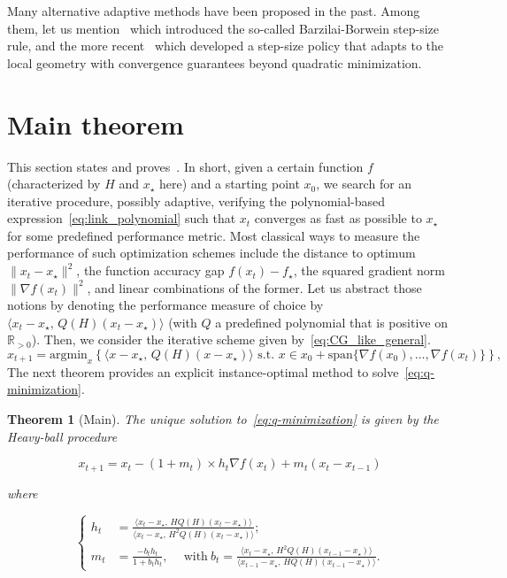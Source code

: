 \documentclass{article}
\newtheorem{Th}{Theorem}[section]
\newcommand{\Span}{\mathrm{span}}
\newcommand{\xs}{x_\star}
\begin{document}
    Many alternative adaptive methods have been proposed in the past.
    Among them, let us mention~\citep{barzilai1988two} which introduced the so-called Barzilai-Borwein step-size rule, and the more recent~\citep{malitsky2019adaptive} which developed a step-size policy that adapts to the local geometry with convergence guarantees beyond quadratic minimization.

\section{Main theorem}\label{sec:main_thm}

    This section states and proves~.
    In short, given a certain function $f$ (characterized by $H$ and $\xs$ here) and a starting point $x_0$,
    we search for an iterative procedure, possibly adaptive, verifying the polynomial-based expression~\cref{eq:link_polynomial} such that $x_t$ converges as fast as possible to $\xs$ for some predefined performance metric.
    Most classical ways to measure the performance of such optimization schemes include the distance to optimum $\|x_t - \xs\|^2$, the function accuracy gap $f(x_t) - f_\star$, the squared gradient norm $\|\nabla f(x_t)\|^2$, and linear combinations of the former.
    Let us abstract those notions by denoting the performance measure of choice by $\langle x_t - \xs,\, Q(H) (x_t - \xs)\rangle$ (with $Q$ a predefined polynomial that is positive on $\mathbb{R}_{>0}$).
    Then, we consider the iterative scheme given by~\eqref{eq:CG_like_general}.
    \begin{equation}\label{eq:q-minimization}
        x_{t+1} = \mathrm{argmin}_x \left\{ \langle x-\xs,\,  Q(H) (x-\xs)\rangle \text{ s.t. } x \in x_0 + \Span \{ \nabla f(x_0), \ldots, \nabla f(x_t)\} \right\} \tag{Q-minimization},
    \end{equation}
    The next theorem provides an explicit instance-optimal method to solve~\cref{eq:q-minimization}.

    \begin{Th}[Main]
        The unique solution to~\cref{eq:q-minimization} is given by the Heavy-ball procedure

        \begin{equation}
            x_{t+1} = x_t - (1 + m_t) \times h_t \nabla f (x_t) + m_t (x_t - x_{t-1})
        \end{equation}

        where

        \begin{equation}
            \left\{
                \begin{array}{ll}
                    h_t & = \frac{\langle x_t - \xs,\, H Q(H) (x_t - \xs)\rangle}{\langle x_t - \xs,\, H^2 Q(H) (x_t - \xs)\rangle}; \\
                    m_t & = \frac{- b_t h_t}{1 + b_t h_t}, \quad \mathrm{~with~} b_t = \frac{\langle x_t - \xs,\, H^2 Q(H) (x_{t-1} - \xs)\rangle}{\langle x_{t-1} - \xs,\, H Q(H) (x_{t-1} - \xs)\rangle}.
                \end{array}
            \right.
            \label{eq:parametrization}
        \end{equation}
    \end{Th}
\end{document}
